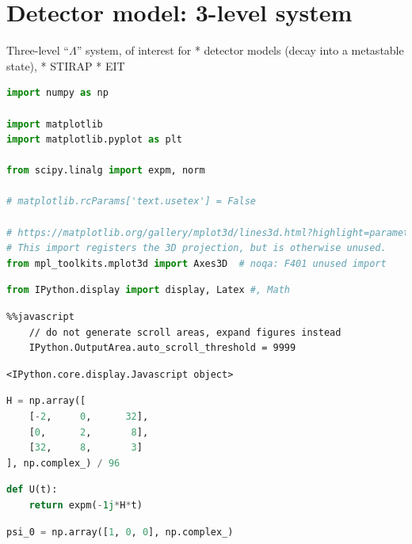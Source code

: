 \hypertarget{detector-model-3-level-system}{%
\section{Detector model: 3-level system}\label{detector-model-3-level-system}}

Three-level ``\(\Lambda\)'' system, of interest for * detector models
(decay into a metastable state), * STIRAP * EIT

\begin{lstlisting}[language=Python]
import numpy as np

import matplotlib
import matplotlib.pyplot as plt

from scipy.linalg import expm, norm

# matplotlib.rcParams['text.usetex'] = False

# https://matplotlib.org/gallery/mplot3d/lines3d.html?highlight=parametric
# This import registers the 3D projection, but is otherwise unused.
from mpl_toolkits.mplot3d import Axes3D  # noqa: F401 unused import
\end{lstlisting}

\begin{lstlisting}[language=Python]
from IPython.display import display, Latex #, Math
\end{lstlisting}

\begin{lstlisting}
%%javascript
    // do not generate scroll areas, expand figures instead
    IPython.OutputArea.auto_scroll_threshold = 9999
\end{lstlisting}

\begin{lstlisting}
<IPython.core.display.Javascript object>
\end{lstlisting}

\begin{lstlisting}[language=Python]
H = np.array([
    [-2,     0,      32],
    [0,      2,       8],
    [32,     8,       3]
], np.complex_) / 96
\end{lstlisting}

\begin{lstlisting}[language=Python]
def U(t):
    return expm(-1j*H*t)
\end{lstlisting}

\begin{lstlisting}[language=Python]
psi_0 = np.array([1, 0, 0], np.complex_)
\end{lstlisting}

